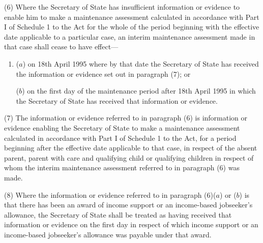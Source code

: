 \documentclass[a4paper,12pt]{article}
\begin{document}
(6) 
Where 
the Secretary of State  %
has insufficient information or evidence to enable him to make a maintenance assessment calculated in accordance with Part I of Schedule 1 to the Act for the whole of the period beginning with the effective date applicable to a particular case, an interim maintenance assessment made in that case shall cease to have effect—
\begin{enumerate}\item[]
($a$) on 18th April 1995 where by that date the Secretary of State has received the information or evidence set out in paragraph (7); or

($b$) on the first day of the maintenance period after 18th April 1995 in which the Secretary of State has received that information or evidence.
\end{enumerate}

(7) The information or evidence referred to in paragraph (6) is information or evidence enabling 
the Secretary of State  %
to make a maintenance assessment calculated in accordance with Part I of Schedule 1 to the Act, for a period beginning after the effective date applicable to that case, in respect of the absent parent, parent with care and qualifying child or qualifying children in respect of whom the interim maintenance assessment referred to in paragraph (6) was made.


(8) Where the information or evidence referred to in paragraph (6)($a$) or ($b$) is that there has been an award of income support or an income-based jobseeker’s allowance, the Secretary of State shall be treated as having received that information or evidence on the first day in respect of which income support or an income-based jobseeker’s allowance was payable under that award.
\end{document}
